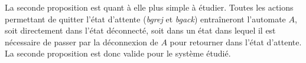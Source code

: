 La seconde proposition est quant à elle plus simple à étudier. Toutes les actions permettant de quitter l'état d'attente (\emph{bgrej} et \emph{bgack}) entraîneront l'automate $A$, soit directement dans l'état déconnecté, soit dans un état dans lequel il est nécessaire de passer par la déconnexion de $A$ pour retourner dans l'état d'attente.  La seconde proposition est donc valide pour le système étudié.





